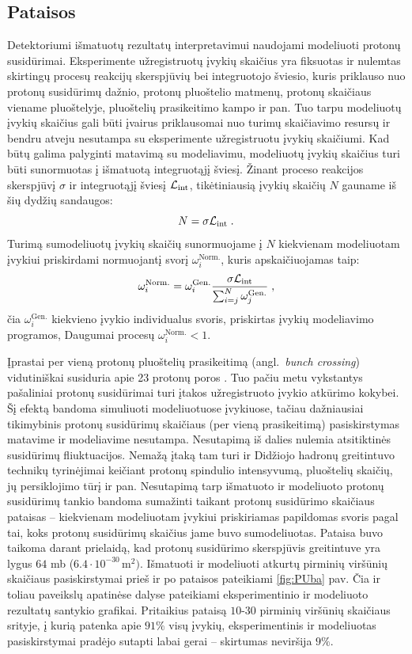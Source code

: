 \documentclass[a4paper, 12pt, oneside]{article}
\newcommand{\Lumi}{{\cal L}_\mathrm{int}}
\newlength\q
\begin{document}
\subsection{Pataisos}\label{sec:corrections}
Detektoriumi išmatuotų rezultatų interpretavimui naudojami modeliuoti protonų susidūrimai.
Eksperimente užregistruotų įvykių skaičius yra fiksuotas ir nulemtas skirtingų procesų reakcijų skerspjūvių bei
integruotojo šviesio, kuris priklauso nuo protonų susidūrimų dažnio, protonų pluoštelio matmenų, protonų skaičiaus
viename pluoštelyje, pluoštelių prasikeitimo kampo ir pan.
Tuo tarpu modeliuotų įvykių skaičius gali būti įvairus priklausomai nuo turimų skaičiavimo resursų ir bendru atveju
nesutampa su eksperimente užregistruotu įvykių skaičiumi.
Kad būtų galima palyginti matavimą su modeliavimu, modeliuotų įvykių skaičius turi būti sunormuotas
į išmatuotą integruotąjį šviesį.
Žinant proceso reakcijos skerspjūvį $\sigma$ ir integruotąjį šviesį $\Lumi$, tikėtiniausią įvykių skaičių $N$
gauname iš šių dydžių sandaugos:
\begin{equation}
	N = \sigma\Lumi \; .
\end{equation}
Turimą sumodeliuotų įvykių skaičių sunormuojame į $N$ kiekvienam modeliuotam įvykiui priskirdami normuojantį svorį
$\omega_{i}^{\mathrm{Norm.}}$, kuris apskaičiuojamas taip:
\begin{equation}
	\omega_{i}^{\mathrm{Norm.}} = \omega_{i}^{\mathrm{Gen.}} \frac{ \sigma\Lumi }{ \sum_{i=j}^{N}\omega_{j}^{\mathrm{Gen.}} } \; ,
	\label{eq:NLOweight}
\end{equation}
čia $\omega_{i}^{\mathrm{Gen.}}$ kiekvieno įvykio individualus svoris, priskirtas įvykių modeliavimo programos,
Daugumai procesų $\omega_{i}^{\mathrm{Norm.}}<1$.

Įprastai per vieną protonų pluoštelių prasikeitimą (angl.\ \textit{bunch crossing}) vidutiniškai susiduria
apie 23 protonų poros \cite{CMSLumi}.
Tuo pačiu metu vykstantys pašaliniai protonų susidūrimai turi įtakos užregistruoto įvykio atkūrimo kokybei.
Šį efektą bandoma simuliuoti modeliuotuose įvykiuose, tačiau dažniausiai tikimybinis protonų susidūrimų
skaičiaus (per vieną prasikeitimą) pasiskirstymas matavime ir modeliavime nesutampa.
Nesutapimą iš dalies nulemia atsitiktinės susidūrimų fliuktuacijos.
Nemažą įtaką tam turi ir Didžiojo hadronų greitintuvo technikų tyrinėjimai keičiant protonų spindulio intensyvumą,
pluoštelių skaičių, jų persiklojimo tūrį ir pan.
Nesutapimą tarp išmatuoto ir modeliuoto protonų susidūrimų tankio bandoma sumažinti taikant protonų susidūrimo
skaičiaus pataisas -- kiekvienam modeliuotam įvykiui priskiriamas papildomas svoris pagal tai, koks protonų
susidūrimų skaičius jame buvo sumodeliuotas.
Pataisa buvo taikoma darant prielaidą, kad protonų susidūrimo skerspjūvis greitintuve yra lygus $64$ mb
($6.4 \cdot 10^{-30} \, \mathrm{m}^2)$.
Išmatuoti ir modeliuoti atkurtų pirminių viršūnių skaičiaus pasiskirstymai prieš ir po pataisos pateikiami \ref{fig:PUba} pav.
Čia ir toliau paveikslų apatinėse dalyse pateikiami eksperimentinio ir modeliuoto rezultatų santykio grafikai.
Pritaikius pataisą $10$-$30$ pirminių viršūnių skaičiaus srityje, į kurią patenka apie $91\%$ visų įvykių,
eksperimentinis ir modeliuotas pasiskirstymai pradėjo sutapti labai gerai -- skirtumas neviršija $9\%$.
\end{document}
